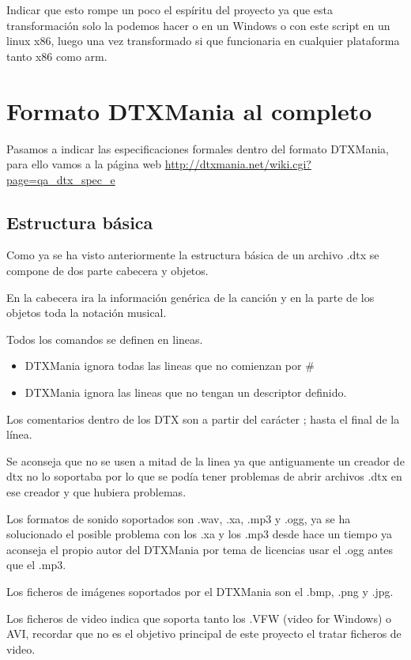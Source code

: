 \documentclass[a4paper,11pt,oneside]{book}
\begin{document}
Indicar que esto rompe un poco el espíritu del proyecto ya que esta transformación solo la podemos hacer o en un Windows o con este script en un linux x86, luego una vez transformado si que funcionaria en cualquier plataforma tanto x86 como arm.

\chapter{Formato DTXMania al completo}

Pasamos a indicar las especificaciones formales dentro del formato DTXMania, para ello vamos a la página web \url{http://dtxmania.net/wiki.cgi?page=qa_dtx_spec_e}

\section{Estructura básica}

Como ya se ha visto anteriormente la estructura básica de un archivo .dtx se compone de dos parte cabecera y objetos.

En la cabecera ira la información genérica de la canción y en la parte de los objetos toda la notación musical.


Todos los comandos se definen en lineas.
\begin{itemize}
  \item DTXMania ignora todas las lineas que no comienzan por \#
  \item DTXMania ignora las lineas que no tengan un descriptor definido.
\end{itemize}

Los comentarios dentro de los DTX son a partir del carácter ; hasta el final de la línea.

Se aconseja que no se usen a mitad de la linea ya que antiguamente un creador de dtx no lo soportaba por lo que se podía tener problemas de abrir archivos .dtx en ese creador y que hubiera problemas.

Los formatos de sonido soportados son .wav, .xa, .mp3 y .ogg, ya se ha solucionado el posible problema con los .xa y los .mp3 desde hace un tiempo ya aconseja el propio autor del DTXMania por tema de licencias usar el .ogg antes que el .mp3.

Los ficheros de imágenes soportados por el DTXMania son el .bmp, .png y .jpg.

Los ficheros de video indica que soporta tanto los .VFW (video for Windows) o AVI, recordar que no es el objetivo principal de este proyecto el tratar ficheros de video.
\end{document}
